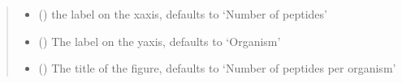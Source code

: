 \documentclass[letterpaper,10pt,english]{sphinxmanual}
\begin{document}
\begin{fulllineitems}
\begin{quote}
\begin{description}
\begin{itemize}
\item {} 
 (\sphinxstyleliteralemphasis{\sphinxupquote{, }}) \textendash{} the label on the x\sphinxhyphen{}axis, defaults to ‘Number of peptides’

\item {} 
 (\sphinxstyleliteralemphasis{\sphinxupquote{, }}) \textendash{} The label on the y\sphinxhyphen{}axis, defaults to ‘Organism’

\item {} 
 (\sphinxstyleliteralemphasis{\sphinxupquote{, }}) \textendash{} The title of the figure, defaults to ‘Number of peptides per organism’

\end{itemize}

\end{description}\end{quote}

\end{fulllineitems}

\end{document}
